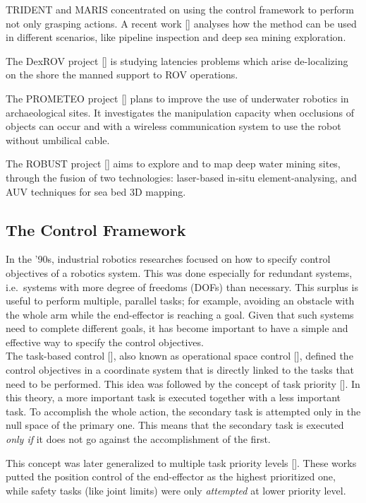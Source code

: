 TRIDENT and MARIS concentrated on using the control framework to perform not only grasping actions. A recent work  [\cite{IntroRecent}] analyses how the method can be used in different scenarios, like pipeline inspection and deep sea mining exploration.

The DexROV project [\cite{IntroDexrov}] is studying latencies problems which arise de-localizing on the shore the manned support to ROV operations.

The PROMETEO project [\cite{IntroPrometeo}] plans to improve the use of underwater robotics in archaeological sites. It investigates the manipulation capacity when occlusions of objects can occur and with a wireless communication system to use the robot without umbilical cable.

The ROBUST project [\cite{IntroRobust}] aims to explore and to map deep water mining sites, through the fusion of two technologies: laser-based in-situ element-analysing, and AUV techniques for sea bed 3D mapping.


\subsection{The Control Framework}
\label{subsec:ControlFramework}
In the '90s, industrial robotics researches focused on how to specify control objectives of a robotics system. This was done especially for redundant systems, i.e.\, systems with more degree of freedoms (DOFs) than necessary. This surplus is useful to perform multiple, parallel tasks; for example, avoiding an obstacle with the whole arm while the end-effector is reaching a goal. Given that such systems need to complete different goals, it has become important to have a simple and effective way to specify the control objectives.\\


The task-based control [\cite{IntroTpik1}], also known as operational space control [\cite{IntroTpik2}], defined the control objectives in a coordinate system that is directly linked to the tasks that need to be performed. This idea was followed by the concept of task priority [\cite{IntroTpik3}]. In this theory, a more important task is executed together with a less important task. To accomplish the whole action, the secondary task is attempted only in the null space of the primary one. This means that the secondary task is executed \textit{only if} it does not go against the accomplishment of the first.

This concept was later generalized to multiple task priority levels [\cite{IntroTpik4}]. These works putted the position control of the end-effector as the highest prioritized one, while safety tasks (like joint limits) were only \textit{attempted} at lower priority level.\\


